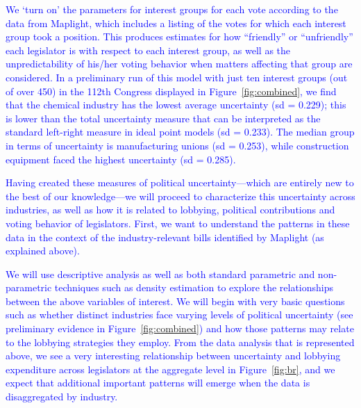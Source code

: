\documentclass[12pt]{article}
\begin{document}
\textcolor{blue}{We `turn on' the parameters for interest groups for each vote according to the data from Maplight, which includes a listing of the votes for which each interest group took a position. This produces estimates for how ``friendly'' or ``unfriendly'' each legislator is with respect to each interest group, as well as the unpredictability of his/her voting behavior when matters affecting that group are considered. In a preliminary run of this model with just ten interest groups (out of over 450) in the 112th Congress displayed in Figure~\ref{fig:combined}, we find that the chemical industry has the lowest average uncertainty (sd = 0.229); this is lower than the total uncertainty measure that can be interpreted as the standard left-right measure in ideal point models (sd = 0.233). The median group in terms of uncertainty is manufacturing unions (sd = 0.253), while construction equipment faced the highest uncertainty (sd = 0.285).}

\textcolor{blue}{Having created these measures of political uncertainty---which are entirely new to the best of our knowledge---we will proceed to characterize this uncertainty across industries, as well as how it is related to lobbying, political contributions and voting behavior of legislators. First, we want to understand the patterns in these data in the context of the industry-relevant bills identified by Maplight (as explained above).} 

\textcolor{blue}{We will use descriptive analysis as well as both standard parametric and non-parametric techniques such as density estimation to explore the relationships between the above variables of interest. We will begin with very basic questions such as whether distinct industries face varying levels of political uncertainty (see preliminary evidence in Figure~\ref{fig:combined}) and how those patterns may relate to the lobbying strategies they employ. From the data analysis that is represented above, we see a very interesting relationship between uncertainty and lobbying expenditure across legislators at the aggregate level in Figure~\ref{fig:br}, and we expect that additional important patterns will emerge when the data is disaggregated by industry.}




\end{document}
